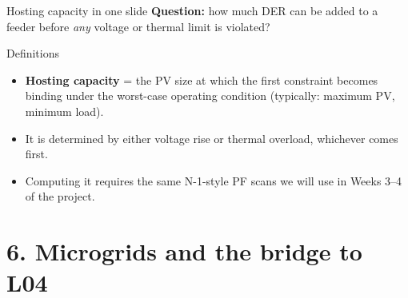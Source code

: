 \documentclass[aspectratio=169,10pt]{beamer}
\begin{document}
\begin{frame}{Hosting capacity in one slide}
\textbf{Question:} how much DER can be added to a feeder before \emph{any} voltage or thermal limit is violated?
\vspace{0.4em}
\centering
{}
\vspace{0.5em}
\begin{block}{Definitions}
\begin{itemize}
  \item \textbf{Hosting capacity} = the PV size at which the first constraint becomes binding under the worst-case operating condition (typically: maximum PV, minimum load).
  \item It is determined by either voltage rise or thermal overload, whichever comes first.
  \item Computing it requires the same N-1-style PF scans we will use in Weeks 3--4 of the project.
\end{itemize}
\end{block}
\end{frame}

\section*{6. Microgrids and the bridge to L04}
\end{document}
